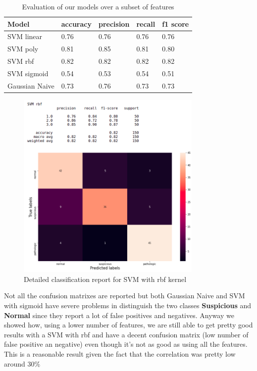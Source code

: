 \documentclass[a4paper,12pt]{article}
\begin{document}
\begin{table}[H]
\begin{tabular}{ |p{6cm}||p{2cm}|p{2cm}|p{2cm}|p{2cm}| }
  \hline
  Model& accuracy & precision  &  recall & f1 score \\
  \hline
  SVM linear &          0.76&   0.76&  0.76&  0.76\\
  SVM poly   &          0.81&   0.85&  0.81&  0.80\\
  SVM rbf    &          0.82&   0.82&  0.82&  0.82\\
  SVM sigmoid &         0.54&   0.53&  0.54&  0.51\\
  Gaussian Naive &         0.73&   0.76&  0.73&  0.73\\
  \hline
\end{tabular}
\caption{Evaluation of our models over a subset of features}
\label{tab:subset}
\end{table}

\begin{figure}[H]
  \begin{center}
  \includegraphics[width=0.8\textwidth]{images/svm_rbf_corr.png}
  \end{center}
  \caption{Detailed classification report for SVM with rbf kernel}
  \label{fig:poly}
\end{figure}

\noindent Not all the confusion matrixes are reported but both Gaussian Naive and SVM with sigmoid have severe problems in distinguish the two classes \textbf{Suspicious} and \textbf{Normal} since they report a lot of false positives and negatives. Anyway we showed how, using a lower number of features, we are still able to get pretty good results with a SVM with rbf and have a decent confusion matrix (low number of false positive an negative) even though it's not as good as using all the features. This is a reasonable result given the fact that the correlation was pretty low around 30\%
\end{document}
